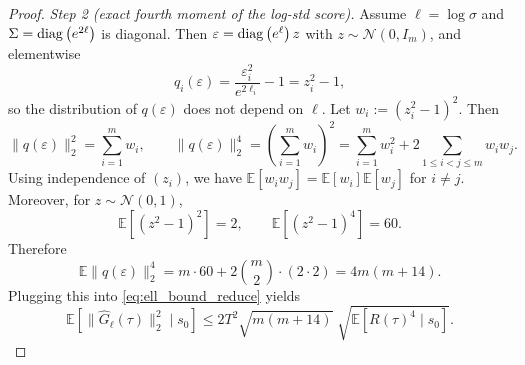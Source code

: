 \begin{proof}
\emph{Step 2 (exact fourth moment of the log-std score).}
Assume $\ell=\log\sigma$ and $\Sigma=\mathrm{diag}\left(e^{2\ell}\right)$ is diagonal. Then $\varepsilon=\mathrm{diag}\left(e^{\ell}\right)z$ with $z\sim\mathcal N(0,I_m)$, and elementwise
\[
q_i(\varepsilon)=\frac{\varepsilon_i^2}{e^{2\ell_i}}-1=z_i^2-1,
\]
so the distribution of $q(\varepsilon)$ does not depend on $\ell$.
Let $w_i:=(z_i^2-1)^2$. Then
\[
\|q(\varepsilon)\|_2^2=\sum_{i=1}^m w_i,
\qquad
\|q(\varepsilon)\|_2^4=\left(\sum_{i=1}^m w_i\right)^2
=\sum_{i=1}^m w_i^2 + 2\sum_{1\le i<j\le m} w_iw_j.
\]
Using independence of $(z_i)$, we have $\mathbb E[w_iw_j]=\mathbb E[w_i]\mathbb E[w_j]$ for $i\neq j$.
Moreover, for $z\sim\mathcal N(0,1)$,
\[
\mathbb E[(z^2-1)^2]=2,\qquad \mathbb E[(z^2-1)^4]=60.
\]
Therefore
\[
\mathbb E\|q(\varepsilon)\|_2^4
=
m\cdot 60 + 2\binom{m}{2}\cdot (2\cdot 2)
=
4m(m+14).
\]
Plugging this into \eqref{eq:ell_bound_reduce} yields
\[
\mathbb E[\|\widehat G_\ell(\tau)\|_2^2\mid s_0]
\le
2T^2\sqrt{m(m+14)}\;\sqrt{\mathbb E[R(\tau)^4\mid s_0]}.
\]

\end{proof}

